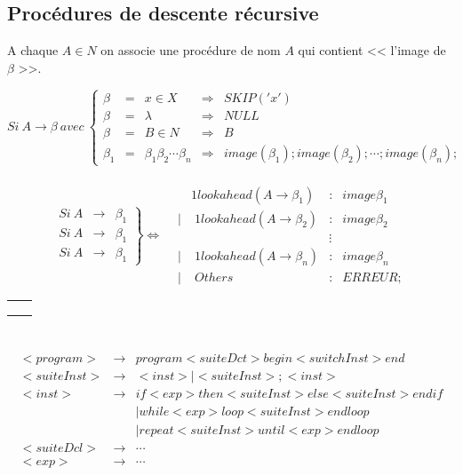 \documentclass[12pt,a4paper,openany]{book}
\begin{document}
\subsection{Procédures de descente récursive}
A chaque $A\in N$ on associe une procédure de nom $A$ qui contient << l'image de $\beta$ >>.

\begin{displaymath}
	Si\ A \rightarrow \beta\ avec\ \left\{
	\begin{array}{ccccc}
		\beta &=& x\in X &\Longrightarrow& SKIP('x')\\
		\beta &=& \lambda &\Longrightarrow& NULL\\
		\beta &=& B \in N &\Longrightarrow& B\\
		\beta_1 &=&  \beta_1\beta_2 \cdots \beta_n &\Longrightarrow& image(\beta_1) ; image(\beta_2); \cdots; image(\beta_n);
	\end{array}
	\right .
\end{displaymath}
\\

\begin{displaymath}
	\left .
	\begin{array}{ccc}
	Si\ A &\rightarrow& \beta_1\\
	Si\ A &\rightarrow& \beta_1\\
	Si\ A &\rightarrow& \beta_1
\end{array}
\right\}
\Longleftrightarrow
\left .
\begin{array}{ccccc}
	&& 1lookahead(A \rightarrow \beta_1) &:& image\beta_1\\
	&|&\;1lookahead(A \rightarrow \beta_2) &:&image\beta_2\\
	&&&\vdots&\\
	&|&\;1lookahead(A \rightarrow \beta_n) &:&image\beta_n\\
	&|&\;Others &:& ERREUR;
\end{array}
\right .
\end{displaymath}

\begin{tabular}{ll}

&
\\
&\\
&

\end{tabular}

\section{}
\begin{eqnarray*}
	<program> &\rightarrow& program<suiteDct> begin <switchInst> end \\
	<suiteInst> &\rightarrow& <inst> | <suiteInst> ; <inst>\\
	<inst> &\rightarrow& if <exp> then <suiteInst> else <suiteInst> end if\\
	&& |while<exp> loop <suiteInst> endloop\\
	&& | repeat<suiteInst> until <exp> endloop \\
	<suiteDcl> &\rightarrow& \cdots\\
	<exp> &\rightarrow& \cdots
\end{eqnarray*}
\end{document}
